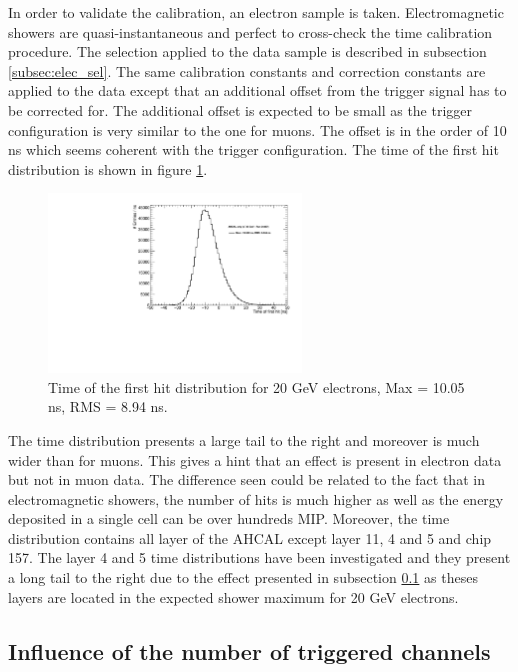 \documentclass[twoside,a4paper,11pt]{article}
\begin{document}
In order to validate the calibration, an electron sample is taken. Electromagnetic showers are quasi-instantaneous and perfect to cross-check the time calibration procedure. The selection applied to the data sample is described in subsection \ref{subsec:elec_sel}. The same calibration constants and correction constants are applied to the data except that an additional offset from the trigger signal has to be corrected for. The additional offset is expected to be small as the trigger configuration is very similar to the one for muons. The offset is in the order of 10 ns which seems coherent with the trigger configuration. The time of the first hit distribution is shown in figure \ref{fig:Timing_electrons}.
\begin{figure}[htbp]
\begin{center}
\includegraphics[width=0.6\textwidth]{fig/Electrons_MuonCalib/Timing_AllLayers.pdf}
\caption{Time of the first hit distribution for 20 GeV electrons, Max = 10.05 ns, RMS = 8.94 ns.}
\label{fig:Timing_electrons}
\end{center}
\end{figure}
The time distribution presents a large tail to the right and moreover is much wider than for muons. This gives a hint that an effect is present in electron data but not in muon data. The difference seen could be related to the fact that in electromagnetic showers, the number of hits is much higher as well as the energy deposited in a single cell can be over hundreds MIP. Moreover, the time distribution contains all layer of the AHCAL except layer 11, 4 and 5 and chip 157. The layer 4 and 5 time distributions have been investigated and they present a long tail to the right due to the effect presented in subsection \ref{subsec:ped_shift} as theses layers are located in the expected shower maximum for 20 GeV electrons.

\subsection{Influence of the number of triggered channels}
\label{subsec:ped_shift}
\end{document}
